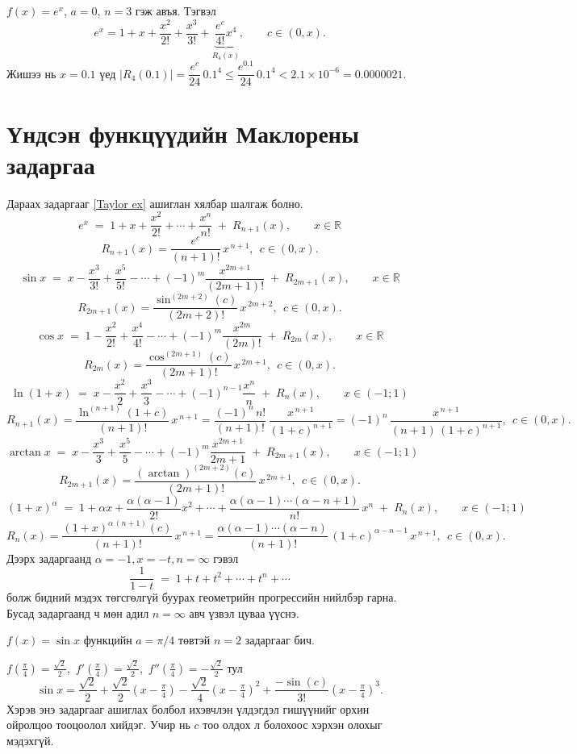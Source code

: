 \begin{example}
$f(x)=e^x$, $a=0$, $n=3$ гэж авъя. Тэгвэл
\[
e^x=1+x+\frac{x^2}{2!}+\frac{x^3}{3!}+\underbrace{\frac{e^c}{4!}x^4}_{R_4(x)},\qquad c\in(0,x).
\]
Жишээ нь $x=0.1$ үед $|R_4(0.1)|=\dfrac{e^{c}}{24}\,0.1^4\le \dfrac{e^{0.1}}{24}\,0.1^4<2.1\times 10^{-6}=0.0000021$.
\end{example}

\section{Үндсэн функцүүдийн Маклорены задаргаа}
Дараах задаргааг \ref{Taylor ex} ашиглан хялбар шалгаж болно.
\[
e^x \;=\; 1 + x + \frac{x^2}{2!} + \cdots + \frac{x^n}{n!} \;+\; R_{n+1}(x), 
\qquad x\in\mathbb{R}\]
\[R_{n+1}(x)=\frac{e^{c}}{(n+1)!}\,x^{\,n+1},\ \ c\in(0,x).
\]
\[
\sin x \;=\; x - \frac{x^3}{3!} + \frac{x^5}{5!} - \cdots + 
(-1)^{m}\frac{x^{2m+1}}{(2m+1)!} \;+\; R_{2m+1}(x), \qquad x\in\mathbb{R}
\]
\[
R_{2m+1}(x)=\frac{\sin^{(2m+2)}(c)}{(2m+2)!}\,x^{\,2m+2},\ \ c\in(0,x).
\]
\[
\cos x \;=\; 1 - \frac{x^2}{2!} + \frac{x^4}{4!} - \cdots + 
(-1)^{m}\frac{x^{2m}}{(2m)!} \;+\; R_{2m}(x), \qquad x\in\mathbb{R}
\]
\[
R_{2m}(x)=\frac{\cos^{(2m+1)}(c)}{(2m+1)!}\,x^{\,2m+1},\ \ c\in(0,x).
\]
\[
\ln(1+x) \;=\; x - \frac{x^2}{2} + \frac{x^3}{3} - \cdots + 
(-1)^{n-1}\frac{x^{n}}{n} \;+\; R_{n}(x), \qquad x\in(-1;1)
\]
\[
R_{n+1}(x)=\frac{\ln^{(n+1)}(1+c)}{(n+1)!}\,x^{\,n+1}
=\frac{(-1)^{n}\,n!}{(n+1)!}\,\frac{x^{\,n+1}}{(1+c)^{n+1}}
= (-1)^{n}\,\frac{x^{\,n+1}}{(n+1)\,(1+c)^{n+1}},\ \ c\in(0,x).
\]
\[
\arctan x \;=\; x - \frac{x^3}{3} + \frac{x^5}{5} - \cdots + 
(-1)^{m}\frac{x^{2m+1}}{2m+1} \;+\; R_{2m+1}(x), \qquad x\in(-1;1)
\]
\[
R_{2m+1}(x)=\frac{(\arctan)^{(2m+2)}(c)}{(2m+1)!}\,x^{\,2m+1},\ \ c\in(0,x).
\]
\[
(1+x)^{\alpha} \;=\; 1 + \alpha x + \frac{\alpha(\alpha-1)}{2!}x^2 + \cdots +
\frac{\alpha(\alpha-1)\cdots(\alpha-n+1)}{n!}\,x^n \;+\; R_{n}(x), \qquad x\in(-1;1)
\]
\[
R_{n}(x)=\frac{(1+x)^{\alpha\,(n+1)}(c)}{(n+1)!}\,x^{\,n+1}
=\frac{\alpha(\alpha-1)\cdots(\alpha-n)}{(n+1)!}\,(1+c)^{\alpha-n-1}\,x^{\,n+1},\ \ c\in(0,x).
\]
Дээрх задаргаанд $\alpha=-1, x=-t, n=\infty$ гэвэл 
\[
\frac{1}{1-t} \;=\; 1 + t + t^2 + \cdots + t^n +\cdots 
\]
болж бидний мэдэх төгсгөлгүй буурах геометрийн прогрессийн нийлбэр гарна. Бусад задаргаанд ч мөн адил $n=\infty$ авч үзвэл цуваа үүснэ.
\begin{example}[Тэйлор $a=\pi/4$ төвтэй]
$f(x)=\sin x$ функцийн $a=\pi/4$ төвтэй $n=2$ задаргааг бич.

$f(\tfrac{\pi}{4})=\tfrac{\sqrt2}{2}$,\ $f'(\tfrac{\pi}{4})=\tfrac{\sqrt2}{2}$,\ $f''(\tfrac{\pi}{4})=-\tfrac{\sqrt2}{2}$ тул
\[
\sin x=\frac{\sqrt2}{2}+\frac{\sqrt2}{2}(x-\tfrac{\pi}{4})-\frac{\sqrt2}{4}(x-\tfrac{\pi}{4})^2+\frac{-\sin(c)}{3!}(x-\tfrac{\pi}{4})^3.
\] Хэрэв энэ задаргааг ашиглах болбол ихэвчлэн үлдэгдэл гишүүнийг орхин ойролцоо тооцоолол хийдэг. Учир нь $c$ тоо олдох л болохоос хэрхэн олохыг мэдэхгүй.
\end{example}

